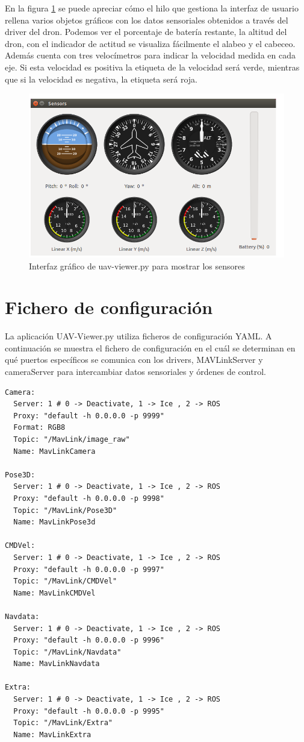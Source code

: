 En la figura \ref{fig:sensores} se puede apreciar cómo el hilo que gestiona la interfaz de usuario rellena varios objetos gráficos con los datos sensoriales obtenidos a través del driver del dron. Podemos ver el porcentaje de batería restante, la altitud del dron, con el indicador de actitud se visualiza fácilmente el alabeo y el cabeceo. Además cuenta con tres velocímetros para indicar la velocidad medida en cada eje. Si esta velocidad es positiva la etiqueta de la velocidad será verde, mientras que si la velocidad es negativa, la etiqueta será roja.

\begin{figure}[H]
  \centering
  \includegraphics[scale=0.4]{imagenes/sensores.png}
  \caption{Interfaz gráfico de uav-viewer.py para mostrar los sensores}
  \label{fig:sensores}
\end{figure}

\section{Fichero de configuración}

La aplicación UAV-Viewer.py utiliza ficheros de configuración YAML. A continuación se muestra el fichero de configuración en el cuál se determinan en qué puertos específicos se comunica con los drivers, MAVLinkServer y cameraServer para intercambiar datos sensoriales y órdenes de control.

\begin{lstlisting}[frame=single]
Camera:
  Server: 1 # 0 -> Deactivate, 1 -> Ice , 2 -> ROS
  Proxy: "default -h 0.0.0.0 -p 9999"
  Format: RGB8
  Topic: "/MavLink/image_raw"
  Name: MavLinkCamera

Pose3D:
  Server: 1 # 0 -> Deactivate, 1 -> Ice , 2 -> ROS
  Proxy: "default -h 0.0.0.0 -p 9998"
  Topic: "/MavLink/Pose3D"
  Name: MavLinkPose3d

CMDVel:
  Server: 1 # 0 -> Deactivate, 1 -> Ice , 2 -> ROS
  Proxy: "default -h 0.0.0.0 -p 9997"
  Topic: "/MavLink/CMDVel"
  Name: MavLinkCMDVel

Navdata:
  Server: 1 # 0 -> Deactivate, 1 -> Ice , 2 -> ROS
  Proxy: "default -h 0.0.0.0 -p 9996"
  Topic: "/MavLink/Navdata"
  Name: MavLinkNavdata

Extra:
  Server: 1 # 0 -> Deactivate, 1 -> Ice , 2 -> ROS
  Proxy: "default -h 0.0.0.0 -p 9995"
  Topic: "/MavLink/Extra"
  Name: MavLinkExtra
\end{lstlisting}


